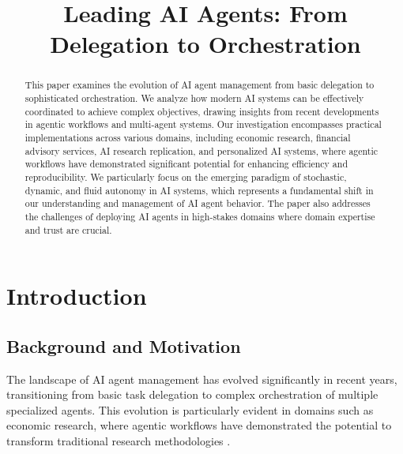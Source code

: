\documentclass[conference]{IEEEtran}
\begin{document}
\title{Leading AI Agents: From Delegation to Orchestration}

\author{
}

\maketitle

\begin{abstract}
This paper examines the evolution of AI agent management from basic delegation to sophisticated orchestration. We analyze how modern AI systems can be effectively coordinated to achieve complex objectives, drawing insights from recent developments in agentic workflows and multi-agent systems. Our investigation encompasses practical implementations across various domains, including economic research, financial advisory services, AI research replication, and personalized AI systems, where agentic workflows have demonstrated significant potential for enhancing efficiency and reproducibility. We particularly focus on the emerging paradigm of stochastic, dynamic, and fluid autonomy in AI systems, which represents a fundamental shift in our understanding and management of AI agent behavior. The paper also addresses the challenges of deploying AI agents in high-stakes domains where domain expertise and trust are crucial.
\end{abstract}

\section{Introduction}
\subsection{Background and Motivation}
The landscape of AI agent management has evolved significantly in recent years, transitioning from basic task delegation to complex orchestration of multiple specialized agents. This evolution is particularly evident in domains such as economic research, where agentic workflows have demonstrated the potential to transform traditional research methodologies \cite{dawid2024agentic}.
\end{document}
